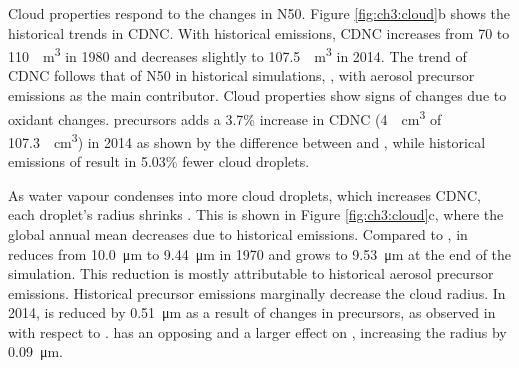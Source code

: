 
Cloud properties respond to the changes in N50. Figure \ref{fig:ch3:cloud}b shows the historical trends in CDNC. With historical emissions, CDNC increases from 70 to \qty{110}{\per\metre\cubed} in 1980 and decreases slightly to \qty{107.5}{\per\metre\cubed} in 2014. The trend of CDNC follows that of N50 in historical simulations, \histsst{}, with aerosol precursor emissions as the main contributor. Cloud properties show signs of changes due to oxidant changes.  precursors adds a 3.7\% increase in CDNC (\qty{4}{\per\centi\metre\cubed} of \qty{107.3}{\per\centi\metre\cubed}) in 2014 as shown by the difference between \sstpio{} and \histsst{}, while historical emissions of  result in 5.03\% fewer cloud droplets.


As water vapour condenses into more cloud droplets, which increases CDNC, each droplet's radius shrinks \citep{twomeyAerosolsCloudsRadiation1991}. This is shown in Figure \ref{fig:ch3:cloud}c, where the global annual mean \Reff{} decreases due to historical emissions. Compared to \sstpiaer{}, \Reff{} in \histsst{} reduces from \qty{10.0}{\micro\metre} to \qty{9.44}{\micro\metre} in 1970 and grows to \qty{9.53}{\micro\metre} at the end of the simulation.  This reduction is mostly attributable to historical aerosol precursor emissions. Historical  precursor emissions marginally decrease the cloud radius. In 2014, \Reff{} is reduced by \qty{0.51}{\micro\metre} as a result of changes in  precursors, as observed in \sstpio{} with respect to \histsst{}.  has an opposing and a larger effect on \Reff{}, increasing the radius by \qty{0.09}{\micro\metre}.


